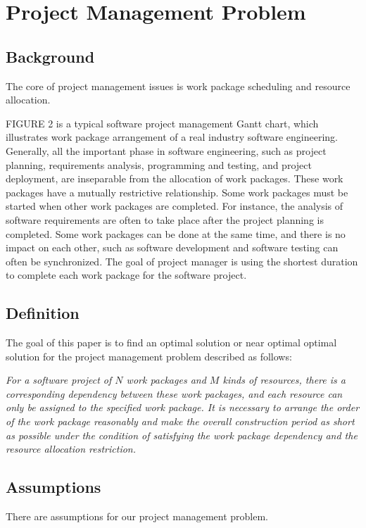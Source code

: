
\section{Project Management Problem}
%

\subsection{Background}
%

The core of project management issues is work package scheduling and
resource allocation.


FIGURE 2 is a typical software project management Gantt chart, which
illustrates work package arrangement of a real industry software
engineering.  Generally, all the important phase in software
engineering, such as project planning, requirements analysis,
programming and testing, and project deployment, are inseparable from
the allocation of work packages.  These work packages have a mutually
restrictive relationship.  Some work packages must be started when
other work packages are completed.  For instance, the analysis of
software requirements are often to take place after the project
planning is completed.  Some work packages can be done at the same
time, and there is no impact on each other, such as software
development and software testing can often be synchronized.  The goal
of project manager is using the shortest duration to complete each
work package for the software project.


\subsection{Definition}
%
The goal of this paper is to find an optimal solution or near optimal
optimal solution for the project management problem described as
follows:

\emph{
  For a software project of $N$ work packages and $M$ kinds of
  resources, there is a corresponding dependency between these work
  packages, and each resource can only be assigned to the specified
  work package.  It is necessary to arrange the order of the work
  package reasonably and make the overall construction period as short
  as possible under the condition of satisfying the work package
  dependency and the resource allocation restriction.
}


\subsection{Assumptions}
%
There are assumptions for our project management problem.

